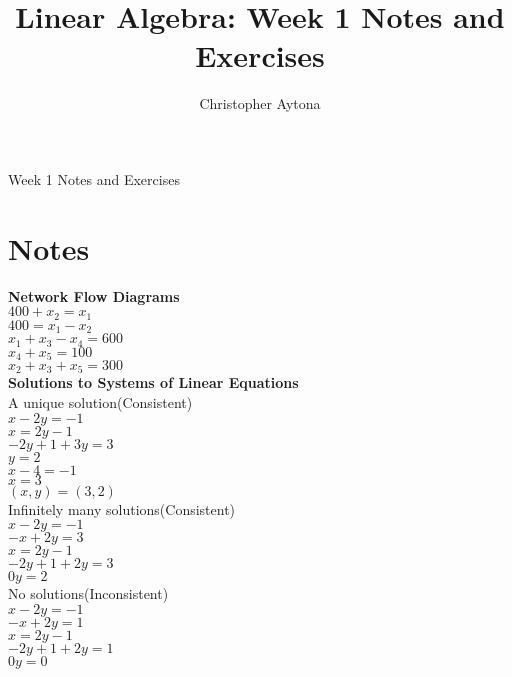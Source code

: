 \documentclass[]{article}
\title{Linear Algebra: Week 1 Notes and Exercises}
\author{Christopher Aytona}
\begin{document}
\begin{center}
\Huge{Week 1 Notes and Exercises}
\end{center}

\section{Notes}
\textbf{Network Flow Diagrams}\\
$400 + x_2 = x_1$\\
$400 = x_1 - x_2$\\
$x_1 + x_3 - x_4 = 600$\\
$x_4 + x_5 = 100$\\
$x_2 + x_3 + x_5 = 300$\\

\textbf{Solutions to Systems of Linear Equations}\\
\textsf{A unique solution(Consistent)}\\
$x - 2y = -1$\\
$x = 2y-1$\\
$-2y+1+3y = 3$\\
$y = 2$\\
$x - 4 = -1$\\
$x = 3$\\
$(x, y) = (3, 2)$\\
\textsf{Infinitely many solutions(Consistent)}\\
$x - 2y = -1$\\
$-x+2y=3$\\
$x = 2y-1$\\
$-2y+1+2y=3$\\
$0y=2$\\
\textsf{No solutions(Inconsistent)}\\
$x-2y=-1$\\
$-x+2y=1$\\
$x=2y-1$\\
$-2y+1+2y=1$\\
$0y=0$\\
\end{document}
